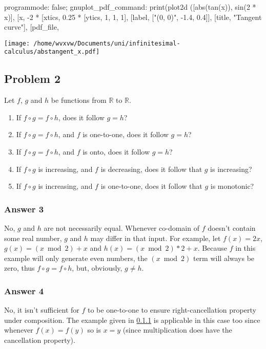 \documentclass[11pt]{article}
\begin{document}
\begin{maxima}
programmode: false;
gnuplot_pdf_command: %
print(plot2d ([abs(tan(x)), sin(2 * x)],
  [x, -2 * %
  [xtics, 0.25 * %
  [ytics, 1, 1, 1], [label, ["(0, 0)", -1.4, 0.4]],
  [title, "Tangent curve"], [pdf_file, %
\end{maxima}

\texttt{[image: /home/wvxvw/Documents/uni/infinitesimal-calculus/abstangent\_x.pdf]}
\subsection{Problem 2}
\label{sec-1-2}
Let $f$, $g$ and $h$ be functions from $\mathbb{R}$ to $\mathbb{R}$.
\begin{enumerate}
\item If $f \circ g = f \circ h$, does it follow $g = h$?
\item If $f \circ g = f \circ h$, and $f$ is one-to-one, does it follow $g = h$?
\item If $f \circ g = f \circ h$, and $f$ is onto, does it follow $g = h$?
\item If $f \circ g$ is increasing, and $f$ is decreasing, does it follow that
      $g$ is increasing?
\item If $f \circ g$ is increasing, and $f$ is one-to-one, does it follow that
      $g$ is monotonic?
\end{enumerate}

\subsubsection{Answer 3}
\label{sec-1-2-1}
No, $g$ and $h$ are not necessarily equal.  Whenever co-domain of $f$
doesn't contain some real number, $g$ and $h$ may differ in that input.
For example, let $f(x) = 2x$, $g(x) = (x \bmod 2) + x$ and
$h(x) = (x \bmod 2) * 2 + x$.  Because $f$ in this example will only
generate even numbers, the $(x \bmod 2)$ term will always be zero,
thus $f \circ g = f \circ h$, but, obviously, $g \neq h$.
\subsubsection{Answer 4}
\label{sec-1-2-2}
No, it isn't sufficient for $f$ to be one-to-one to ensure right-cancellation
property under composition.  The example given in \ref{sec-1-2-1} is applicable
in this case too since whenever $f(x) = f(y)$ so is $x = y$ (since multiplication
does have the cancellation property).
\end{document}
